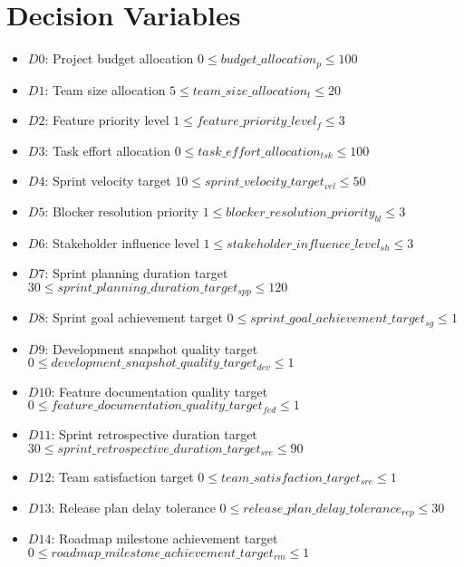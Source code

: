 \documentclass{article}
\begin{document}
\section{Decision Variables}
\begin{itemize}
    \item $D0$: Project budget allocation $0 \leq budget\_allocation_p \leq 100$
    \item $D1$: Team size allocation $5 \leq team\_size\_allocation_t \leq 20$
    \item $D2$: Feature priority level $1 \leq feature\_priority\_level_f \leq 3$
    \item $D3$: Task effort allocation $0 \leq task\_effort\_allocation_{tsk} \leq 100$
    \item $D4$: Sprint velocity target $10 \leq sprint\_velocity\_target_{vel} \leq 50$
    \item $D5$: Blocker resolution priority $1 \leq blocker\_resolution\_priority_{bl} \leq 3$
    \item $D6$: Stakeholder influence level $1 \leq stakeholder\_influence\_level_{sh} \leq 3$
    \item $D7$: Sprint planning duration target $30 \leq sprint\_planning\_duration\_target_{spp} \leq 120$
    \item $D8$: Sprint goal achievement target $0 \leq sprint\_goal\_achievement\_target_{sg} \leq 1$
    \item $D9$: Development snapshot quality target $0 \leq development\_snapshot\_quality\_target_{dev} \leq 1$
    \item $D10$: Feature documentation quality target $0 \leq feature\_documentation\_quality\_target_{fed} \leq 1$
    \item $D11$: Sprint retrospective duration target $30 \leq sprint\_retrospective\_duration\_target_{sre} \leq 90$
    \item $D12$: Team satisfaction target $0 \leq team\_satisfaction\_target_{sre} \leq 1$
    \item $D13$: Release plan delay tolerance $0 \leq release\_plan\_delay\_tolerance_{rep} \leq 30$
    \item $D14$: Roadmap milestone achievement target $0 \leq roadmap\_milestone\_achievement\_target_{rm} \leq 1$
\end{itemize}
\end{document}
